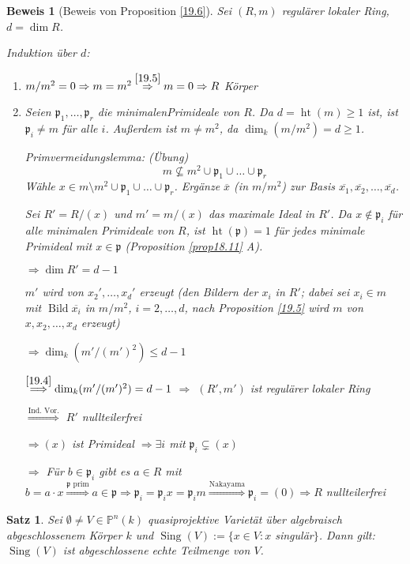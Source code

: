 \documentclass[a4paper, 12pt, numbers=noendperiod, chapterprefix=true]{scrbook}
\theoremstyle{break}
\newtheorem{Satz}{Satz}
\theoremstyle{nonumberbreak}
\newtheorem{Bew}{Beweis}
\theoremstyle{nonumberplain}
\DeclareMathOperator{\Bild}{Bild}
\DeclareMathOperator{\Sing}{Sing}
\DeclareMathOperator{\Ht}{ht}
\newcommand{\IP}{\mathbb{P}}%
\newcommand{\frakp}{\mathfrak{p}}
\begin{document}
\begin{Bew}[Beweis von Proposition \ref{19.6}]
Sei $(R,m)$ regul\"arer lokaler Ring, $d=\dim R$.

\emph{Induktion \"uber $d$:}\begin{enumerate}[\underline{$d=0$}:]
\item[\underline{$d=0$}:]
	$m/m^2=0\Rightarrow m=m^2 \overset{\ref{19.5}}{\Rightarrow} m=0 \Rightarrow R$ K\"orper
\item[\underline{$d\ge1$}:]
	Seien $\frakp_1,\ldots ,\frakp_r$ die minimalenPrimideale von $R$. Da $d=\Ht(m)\ge1$ ist, ist $\frakp_i\ne m$ f\"ur alle $i$. Au\ss erdem ist $m\ne m^2$, da $\dim_k(m/m^2)=d\ge1$.
	
	\emph{Primvermeidungslemma:} (\"Ubung)
		\[m\nsubseteq m^2 \cup \frakp_1\cup\ldots \cup \frakp_r\]
	W\"ahle $x\in m\setminus m^2 \cup \frakp_1 \cup \ldots \cup \frakp_r$. Erg\"anze $\overline{x}$ (in $m/m^2$) zur Basis $\overline{x_1}, \overline{x_2},\ldots ,\overline{x_d}$.
	
	Sei $R'=R/(x)$ und $m'=m/(x)$ das maximale Ideal in $R'$. Da $x\notin \frakp_i$ f\"ur alle minimalen Primideale von $R$, ist $\Ht(\frakp)=1$ f\"ur jedes minimale Primideal mit $x\in \frakp$ (Proposition \ref{prop18.11} A).
	
	$\Rightarrow \dim R' = d-1$
	
	$m'$ wird von $x_2',\ldots ,x_d'$ erzeugt (den Bildern der $x_i$ in $R'$; dabei sei $x_i\in m$ mit $\Bild \overline{x_i}$ in $m/m^2$, $i=2,\ldots ,d$, nach Proposition \ref{19.5} wird $m$ von $x,x_2,\ldots ,x_d$ erzeugt)
	
	$\Rightarrow \dim_k(m'/(m')^2)\le d-1$
	
	$\overset{\ref{19.4}}{\Longrightarrow} \dim_k(m'/(m')^2)=d-1$ $\Rightarrow$ $(R',m')$ ist regul\"arer lokaler Ring
	
	$\overset{\text{Ind. Vor.}}{\Longrightarrow}$ $R'$ nullteilerfrei
	
	$\Rightarrow (x)$ ist Primideal $\Rightarrow \exists i$ mit $\frakp_i\subsetneq(x)$
	
	$\Rightarrow $ F\"ur $b\in \frakp_i$ gibt es $a\in R$ mit $b=a\cdot x \overset{\frakp \text{ prim}}{\Longrightarrow} a\in \frakp \Rightarrow \frakp_i = \frakp_ix= \frakp_im \overset{\text{Nakayama}}{\Longrightarrow} \frakp_i=(0) \Rightarrow R$ nullteilerfrei
\end{enumerate}
\end{Bew}

\begin{Satz}
Sei $\emptyset\ne V\in \IP^n(k)$ quasiprojektive Variet\"at \"uber algebraisch abgeschlossenem K\"orper $k$ und $\Sing(V):=\{x\in V: x$ singul\"ar$\}$. Dann gilt: $\Sing(V)$ ist abgeschlossene echte Teilmenge von $V$.
\end{Satz}
\end{document}
